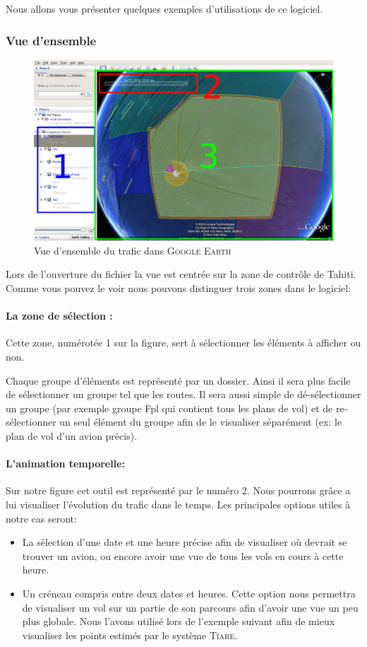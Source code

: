Nous allons vous présenter quelques exemples d'utilisations de ce logiciel.

        \subsubsection{Vue d'ensemble}
\begin{figure}[!h]
\center
\includegraphics[width=12cm]{images/gevuedensemble.png}
\caption{Vue d’ensemble du trafic dans \textsc{Google Earth}}
\label{gevuedensemble}
\end{figure}
Lors de l'ouverture du fichier la vue est centrée sur la zone de contrôle de Tahiti. Comme vous pouvez le voir  nous pouvons distinguer trois zones dans le logiciel:
            \paragraph{La zone de sélection :}
Cette zone, numérotée 1 sur la figure, sert à sélectionner les éléments à afficher ou non. 

Chaque groupe d'éléments est représenté par un dossier. Ainsi il sera plus facile de sélectionner un groupe tel que les routes. Il sera aussi simple de dé-sélectionner un groupe (par exemple groupe Fpl qui contient tous les plans de vol) et de re-sélectionner un seul élément du groupe afin de le visualiser séparément (ex: le plan de vol d'un avion précis).

            \paragraph{L'animation temporelle:}
Sur notre figure cet outil est représenté par le numéro 2. Nous pourrons grâce a lui visualiser l'évolution du trafic dans le temps. Les principales options utiles à notre cas seront:
\begin{itemize}
\item La sélection d'une date et une heure précise afin de visualiser où devrait se trouver un avion, ou encore avoir une vue de tous les vols en cours à cette heure.
\item Un créneau compris entre deux dates et heures. Cette option nous permettra de visualiser un vol sur un partie de son parcours afin d'avoir une vue un peu plus globale. Nous l'avons utilisé lors de l'exemple suivant  afin de mieux visualiser les points estimés par le système \textsc{Tiare}.
\end{itemize}

